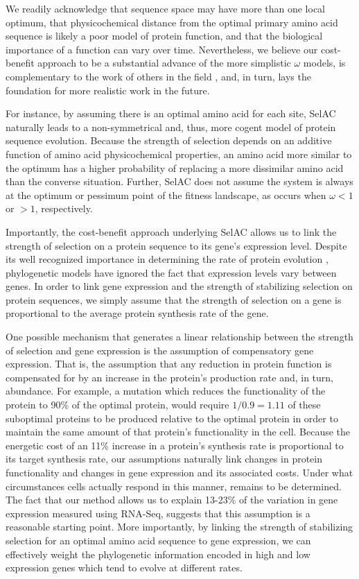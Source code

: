 \documentclass[12pt,letterpaper,fleqn]{article}
\newcommand{\PC}{physicochemical\xspace}
\newcommand{\selac}{SelAC\xspace}
\begin{document}
We readily acknowledge that sequence space may have more than one local optimum, that \PC distance from the optimal primary amino acid sequence is likely a poor model of protein function, and that the biological importance of a function can vary over time.
Nevertheless, we believe our cost-benefit approach to be a substantial advance of the more simplistic $\omega$ models, is complementary to the work of others in the field \citep[e.g.][]{ThorneEtAl2012,RodrigueAndLartillot2014}, and, in turn, lays the foundation for more realistic work in the future.

For instance, by assuming there is an optimal amino acid for each site, \selac naturally leads to a non-symmetrical and, thus, more cogent model of protein sequence evolution.
Because the strength of selection depends on an additive function of amino acid \PC properties, an amino acid more similar to the optimum has a higher probability of replacing a more dissimilar amino acid than the converse situation.
Further, \selac does not assume the system is always at the optimum or pessimum point of the fitness landscape, as occurs when $\omega < 1$ or $>1$, respectively.

Importantly, the cost-benefit approach underlying \selac allows us to link the strength of selection on a protein sequence to its gene's expression level.
Despite its well recognized importance in determining the rate of protein evolution \citep[e.g.][]{DrummondEtAl2005,DrummondEtAl2006a}, phylogenetic models have ignored the fact that expression levels vary between genes.
In order to link gene expression and the strength of stabilizing selection on protein sequences, we simply assume that the strength of selection on a gene is proportional to the average protein synthesis rate of the gene.

One possible mechanism that generates a linear relationship between the strength of selection and gene expression is the assumption of compensatory gene expression.
That is, the assumption that any reduction in protein function is compensated for by an increase in the protein's production rate and, in turn, abundance.
For example, a mutation which reduces the functionality of the protein to 90\% of the optimal protein, would require $1/0.9 = 1.11$ of these suboptimal proteins to be produced relative to the optimal protein in order to maintain the same amount of that protein's functionality in the cell.
Because the energetic cost of an 11\% increase in a protein's synthesis rate is proportional to its target synthesis rate, our assumptions naturally link changes in protein functionality and changes in gene expression and its associated costs.
Under what circumstances cells actually respond in this manner, remains to be determined.
The fact that our method allows us to explain 13-23\% of the variation in gene expression measured using RNA-Seq, suggests that this assumption is a reasonable starting point.
More importantly, by linking the strength of stabilizing selection for an optimal amino acid sequence to gene expression, we can effectively weight the phylogenetic information encoded in high and low expression genes which tend to evolve at different rates.
\end{document}
